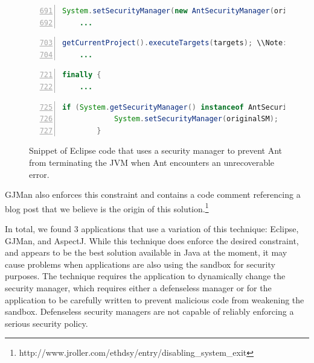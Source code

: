 \documentclass{sig-alternate}
\begin{document}
\begin{figure}
\begin{lstlisting}[language=Java,numbers=left,basicstyle={\scriptsize},breaklines=true,firstnumber=691,xrightmargin={0.1cm},numbersep={-10pt}]
    System.setSecurityManager(new AntSecurityManager(originalSM, Thread.currentThread()));
    ...
\end{lstlisting}


\begin{lstlisting}[language=Java,numbers=left,basicstyle={\scriptsize},breaklines=true,firstnumber=703,xrightmargin={0.1cm},numbersep={-10pt}]
    getCurrentProject().executeTargets(targets); \\Note: Ant is executed on this line
    ...
\end{lstlisting}


\begin{lstlisting}[language=Java,numbers=left,basicstyle={\scriptsize},breaklines=true,firstnumber=721,xrightmargin={0.1cm},numbersep={-10pt}]
    finally {
    ...
\end{lstlisting}


\begin{lstlisting}[language=Java,numbers=left,basicstyle={\scriptsize},breaklines=true,firstnumber=725,xrightmargin={0.1cm},numbersep={-10pt}]
        if (System.getSecurityManager() instanceof AntSecurityManager) { 
            System.setSecurityManager(originalSM); 
        }
\end{lstlisting}


\protect\caption{Snippet of Eclipse code that uses a security manager to prevent Ant
from terminating the JVM when Ant encounters an unrecoverable error.}\label{fig:Eclipse-snippet}
\end{figure}

GJMan also enforces this constraint and contains a code comment referencing a
blog post that we believe is the origin of this solution.\footnote{http://www.jroller.com/ethdsy/entry/disabling\_system\_exit} 

In total, we found 3 applications that use a variation of this technique:
Eclipse, GJMan, and AspectJ. While this technique does enforce the
desired constraint, and appears to be the best solution available
in Java at the moment, it may cause problems when applications are
also using the sandbox for security purposes. The technique requires
the application to dynamically change the security manager, which requires either a defenseless manager or for the application
to be carefully written to prevent malicious code from weakening the sandbox. Defenseless security managers
are not capable of reliably enforcing a serious security policy.
\end{document}
